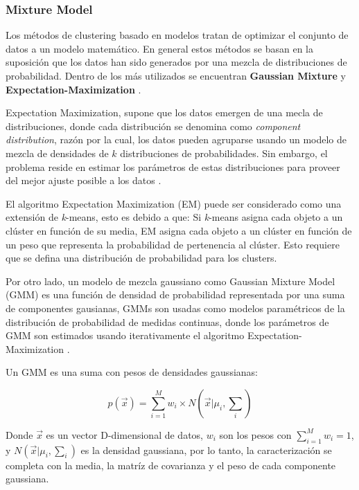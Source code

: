 \subsubsection{Mixture Model}

Los métodos de clustering basado en modelos tratan de optimizar el conjunto de datos a un modelo
matemático. En general estos métodos se basan en la suposición que los datos han sido generados por una mezcla de distribuciones de probabilidad. Dentro de los más utilizados se encuentran \textbf{Gaussian Mixture} \cite{zivkovic2004improved} y \textbf{Expectation-Maximization} \cite{moon1996expectation}.

Expectation Maximization, supone que los datos emergen de una mecla de distribuciones, donde cada distribución se denomina como \textit{component distribution}, razón por la cual, los datos pueden agruparse usando un modelo de mezcla de densidades de $k$ distribuciones de probabilidades. Sin embargo, el problema reside en estimar los parámetros de estas distribuciones para proveer del mejor ajuste posible a los datos \cite{moon1996expectation}. 

El algoritmo Expectation Maximization (EM) puede ser considerado como una extensión de \textit{k}-means, esto es debido a que: Si \textit{k}-means asigna cada objeto a un clúster en función de su media, EM asigna cada objeto a un clúster en función de un peso que representa la probabilidad de pertenencia al clúster. Esto requiere que se defina una distribución de probabilidad para los clusters.

Por otro lado, un modelo de mezcla gaussiano como Gaussian Mixture Model (GMM) es una función de densidad de probabilidad representada por una suma de componentes gausianas, GMMs son usadas como modelos paramétricos de la distribución de probabilidad de medidas continuas, donde los parámetros de GMM son estimados usando iterativamente el algoritmo Expectation-Maximization \cite{zivkovic2004improved}.

Un GMM es una suma con pesos de densidades gaussianas:

\begin{equation}	
	p(\vec{x}) = \sum_{i=1}^{M} w_i \times N(\vec{x}|\mu_i, \sum_{i})
\end{equation}

Donde $\vec{x}$ es un vector D-dimensional de datos, $w_i$ son los pesos con $\sum_{i=1}^{M} w_i = 1$, y $N(\vec{x}|\mu_i, \sum_{i})$ es la densidad gaussiana, por lo tanto, la caracterización se completa con la media, la matríz de covarianza y el peso de cada componente gaussiana.

